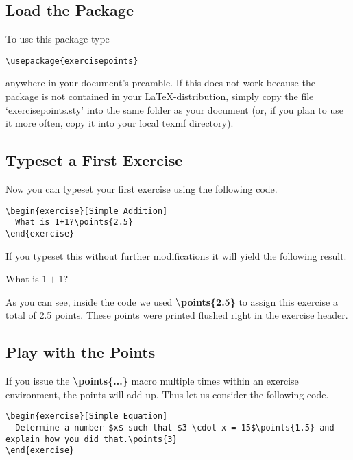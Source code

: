 \documentclass[
  twocolumn,%
  fontsize=9pt,%
  DIV=calc,%
  numbers=noendperiod%
]{scrartcl}
\begin{document}
\subsection{Load the Package}
To use this package type
\begin{lstlisting}
\usepackage{exercisepoints}
\end{lstlisting}
anywhere in your document's preamble. If this does not work because the package is not contained in your \LaTeX-distribution, simply copy the file `exercisepoints.sty' into the same folder as your document (or, if you plan to use it more often, copy it into your local texmf directory).

\subsection{Typeset a First Exercise}
Now you can typeset your first exercise using the following code.

\begin{lstlisting}
\begin{exercise}[Simple Addition]
  What is 1+1?\points{2.5}
\end{exercise}
\end{lstlisting}

\noindent If you typeset this without further modifications it will yield the following result.\vspace{1cm}

\begin{exercise}
  What is $1+1$?
\end{exercise}
%
As you can see, inside the code we used \textcolor{NavyBlue}{\ttfamily\bfseries \textbackslash points\{2.5\}} to assign this exercise a total of 2.5 points. These points were printed flushed right in the exercise header.

\subsection{Play with the Points}
If you issue the \textcolor{NavyBlue}{\ttfamily\bfseries \textbackslash points\{...\}} macro multiple times within an exercise environment, the points will add up. Thus let us consider the following code.

\begin{lstlisting}
\begin{exercise}[Simple Equation]
  Determine a number $x$ such that $3 \cdot x = 15$\points{1.5} and explain how you did that.\points{3}
\end{exercise} 
\end{lstlisting}
\end{document}
